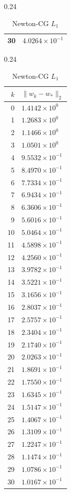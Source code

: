 \documentclass[italian, a4paper, twoside, binding=6mm]{sapthesis}
\begin{document}
\begin{table}[H]
\begin{subtable}{0.24\textwidth}
\begin{tabular}{@{}rl@{}}
30 & $4.0264\times10^{-1}$\\
\bottomrule
\end{tabular}
\end{subtable}\hfill
\begin{subtable}{0.24\textwidth}
\centering
\caption{Newton-CG $L_1$}
\begin{tabular}{@{}rl@{}}
\toprule
$k$ & $\|w_k-w_*\|_2$\\
\midrule
0 & $1.4142\times10^{0}$\\
1 & $1.2683\times10^{0}$\\
2 & $1.1466\times10^{0}$\\
3 & $1.0501\times10^{0}$\\
4 & $9.5532\times10^{-1}$\\
5 & $8.4970\times10^{-1}$\\
6 & $7.7334\times10^{-1}$\\
7 & $6.9434\times10^{-1}$\\
8 & $6.3606\times10^{-1}$\\
9 & $5.6016\times10^{-1}$\\
10 & $5.0464\times10^{-1}$\\
11 & $4.5898\times10^{-1}$\\
12 & $4.2560\times10^{-1}$\\
13 & $3.9782\times10^{-1}$\\
14 & $3.5221\times10^{-1}$\\
15 & $3.1656\times10^{-1}$\\
16 & $2.8037\times10^{-1}$\\
17 & $2.5757\times10^{-1}$\\
18 & $2.3404\times10^{-1}$\\
19 & $2.1740\times10^{-1}$\\
20 & $2.0263\times10^{-1}$\\
21 & $1.8691\times10^{-1}$\\
22 & $1.7550\times10^{-1}$\\
23 & $1.6345\times10^{-1}$\\
24 & $1.5147\times10^{-1}$\\
25 & $1.4067\times10^{-1}$\\
26 & $1.3109\times10^{-1}$\\
27 & $1.2247\times10^{-1}$\\
28 & $1.1474\times10^{-1}$\\
29 & $1.0786\times10^{-1}$\\
30 & $1.0167\times10^{-1}$\\
\bottomrule
\end{tabular}

\end{subtable}
\end{table}
\end{document}

